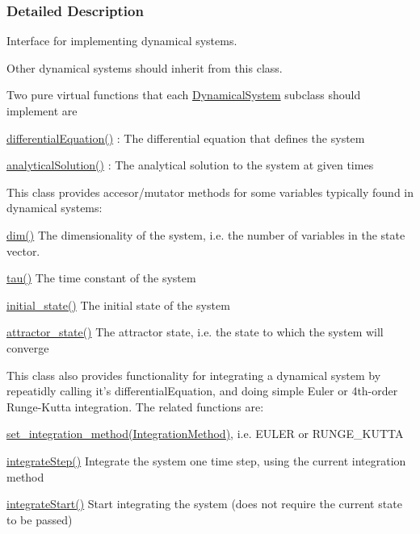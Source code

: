 \subsubsection{Detailed Description}
Interface for implementing dynamical systems. 

Other dynamical systems should inherit from this class.

Two pure virtual functions that each \hyperlink{classDmpBbo_1_1DynamicalSystem}{Dynamical\+System} subclass should implement are \begin{DoxyItemize}
\item \hyperlink{classDmpBbo_1_1DynamicalSystem_a70acc98a8e024f9b6e0e6de1b519e260}{differential\+Equation()} \+: The differential equation that defines the system \item \hyperlink{classDmpBbo_1_1DynamicalSystem_ab6092038efc51ebd122e7c0878f6557d}{analytical\+Solution()} \+: The analytical solution to the system at given times\end{DoxyItemize}
This class provides accesor/mutator methods for some variables typically found in dynamical systems\+: \begin{DoxyItemize}
\item \hyperlink{group__DynamicalSystems_ga6f628f7f4ed9d77bf69f5b8560b98f18}{dim()} The dimensionality of the system, i.\+e. the number of variables in the state vector. \item \hyperlink{group__DynamicalSystems_ga50eec7ad4c9664b5809ace45b22200d5}{tau()} The time constant of the system \item \hyperlink{group__DynamicalSystems_ga4c7f24e7deec1629548a075015bdc693}{initial\+\_\+state()} The initial state of the system \item \hyperlink{group__DynamicalSystems_gaebe3c462bc4a725cb17bcc3d13285f13}{attractor\+\_\+state()} The attractor state, i.\+e. the state to which the system will converge\end{DoxyItemize}
This class also provides functionality for integrating a dynamical system by repeatidly calling it's differential\+Equation, and doing simple Euler or 4th-\/order Runge-\/\+Kutta integration. The related functions are\+: \begin{DoxyItemize}
\item \hyperlink{group__DynamicalSystems_ga07a2df4cc46a521ab81c614d79b33669}{set\+\_\+integration\+\_\+method(\+Integration\+Method)}, i.\+e. E\+U\+L\+E\+R or R\+U\+N\+G\+E\+\_\+\+K\+U\+T\+T\+A \item \hyperlink{classDmpBbo_1_1DynamicalSystem_ac7ed7ce2faa8314cd9fa5ffcccb15349}{integrate\+Step()} Integrate the system one time step, using the current integration method \item \hyperlink{classDmpBbo_1_1DynamicalSystem_a44dd496535fde494d8465e7603c93db3}{integrate\+Start()} Start integrating the system (does not require the current state to be passed) \end{DoxyItemize}



